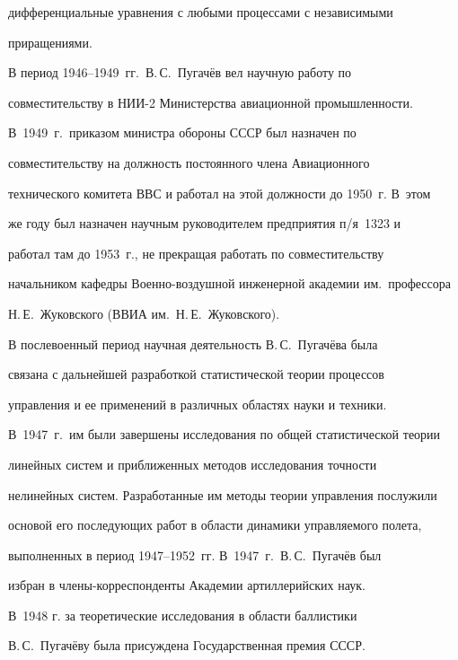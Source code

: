 дифференциальные уравнения с любыми процессами с независимыми 


приращениями.


     


     В период 1946--1949~гг.\ В.\,С.~Пугачёв вел научную работу по 


совместительству в НИИ-2 Министерства авиационной промышленности. 


В~1949~г.\ приказом министра обороны  СССР был назначен по 


совместительству на должность постоянного члена Авиационного 


технического комитета ВВС и работал на этой должности до 1950~г. В~этом 


же году был назначен научным руководителем предприятия п/\!я~1323 и 


работал там до 1953~г., не прекращая работать по совместительству 


начальником кафедры Во\-ен\-но-воз\-душ\-ной инженерной академии им.\ профессора 


Н.\,Е.~Жуковского (ВВИА им.\ Н.\,Е.~Жуковского).


     


     В послевоенный период научная деятельность В.\,С.~Пугачёва была 


связана с дальнейшей разработкой статистической теории процессов 


управления и ее применений в различных областях науки и техники. 


В~1947~г.\ им были завершены исследования по общей статистической теории 


линейных систем и приближенных методов исследования точности 


нелинейных систем. Разработанные им методы теории управления послужили 


основой его последующих работ в области динамики управляемого полета, 


выполненных в период 1947--1952~гг. В~1947~г.\ В.\,С.~Пугачёв был 


избран в чле\-ны-кор\-рес\-пон\-ден\-ты Академии артиллерийских наук. 


В~1948 г. за теоретические исследования в области баллистики 


В.\,С.~Пугачёву была присуждена Государственная премия СССР. 


     


